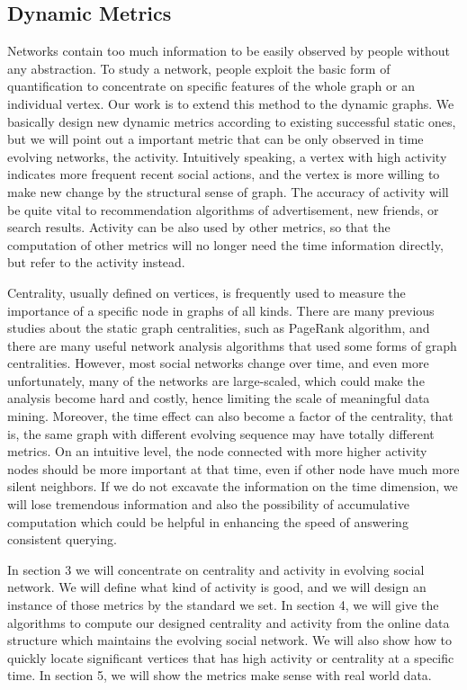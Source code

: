\documentclass[12pt,abstract=true]{scrartcl}
\numberwithin{equation}{section}
\theoremstyle{definition}   \newtheorem{definition}{Definition}[section]
\theoremstyle{plain}        \newtheorem{theorem}{Theorem}[section]
\theoremstyle{plain}        \newtheorem{observation}{Observation}[section]
\theoremstyle{plain}        \newtheorem{fact}{Fact}[section]
\theoremstyle{plain}        \newtheorem{claim}{Claim}[section]
\theoremstyle{plain}        \newtheorem{lemma}[theorem]{Lemma}
\theoremstyle{plain}        \newtheorem{corollary}[theorem]{Corollary}
\theoremstyle{remark}       \newtheorem{example}{Example}[section]
\theoremstyle{remark}       \newtheorem{remark}{Remark}[section]
\begin{document}
\subsection{Dynamic Metrics}
Networks contain too much information to be easily observed by people without
any abstraction. To study a network, people exploit the basic form of
quantification to concentrate on specific features of the whole graph or an
individual vertex. Our work is to extend this method to the dynamic graphs. We
basically design new dynamic metrics according to existing successful static
ones, but we will point out a important metric that can be only observed in
time evolving networks, the activity. Intuitively speaking, a vertex with high
activity indicates more frequent recent social actions, and the vertex is more
willing to make new change by the structural sense of graph. The accuracy of
activity will be quite vital to recommendation algorithms of advertisement, new
friends, or search results. Activity can be also used by other metrics, so that
the computation of other metrics will no longer need the time information
directly, but refer to the activity instead.

Centrality, usually defined on vertices, is frequently used to measure the
importance of a specific node in graphs of all kinds. There are many previous
studies about the static graph centralities\cite{newman2010networks}, such as
PageRank algorithm\cite{page1999pagerank}, and there are many useful network
analysis algorithms that used some forms of graph centralities. However, most
social networks change over time, and even more unfortunately, many of the
networks are large-scaled, which could make the analysis become hard and
costly, hence limiting the scale of meaningful data mining. Moreover, the time
effect can also become a factor of the centrality, that is, the same graph with
different evolving sequence may have totally different metrics. On an intuitive
level, the node connected with more higher activity nodes should be more
important at that time, even if other node have much more silent neighbors. If
we do not excavate the information on the time dimension, we will lose
tremendous information and also the possibility of accumulative computation
which could be helpful in enhancing the speed of answering consistent
querying.

In section 3 we will concentrate on centrality and activity in evolving social
network. We will define what kind of activity is good, and we will design
an instance of those metrics by the standard we set. In section 4, we will
give the algorithms to compute our designed centrality and activity from the
online data structure which maintains the evolving social network. We will also
show how to quickly locate significant vertices that has high activity or
centrality at a specific time. In section 5, we will show the metrics make
sense with real world data.
\end{document}
